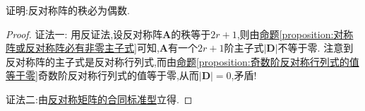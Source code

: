 \documentclass[../../main.tex]{subfiles}%
\begin{document}
\begin{proposition}[反对称阵的秩必为偶数]\label{proposition:反对称阵的秩必为偶数}
证明:反对称阵的秩必为偶数.
\end{proposition}
\begin{proof}

{\color{blue}证法一:}
用反证法,设反对称阵\(\boldsymbol{A}\)的秩等于\(2r + 1\),则由\hyperref[proposition:对称阵或反对称阵必有非零主子式]{命题\ref{proposition:对称阵或反对称阵必有非零主子式}}可知,\(\boldsymbol{A}\)有一个\(2r + 1\)阶主子式\(|\boldsymbol{D}|\)不等于零. 注意到反对称阵的主子式是反对称行列式,而由\hyperref[proposition:奇数阶反对称行列式的值等于零]{命题\ref{proposition:奇数阶反对称行列式的值等于零}}奇数阶反对称行列式的值等于零,从而\(|\boldsymbol{D}| = 0\),矛盾!

{\color{blue}证法二:}由\hyperref[theorem:反对称矩阵的合同标准型]{反对称矩阵的合同标准型}立得.
\end{proof}
\end{document}

